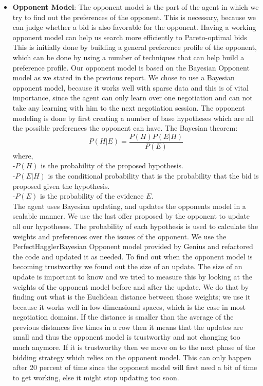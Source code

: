 \documentclass{article}
\begin{document}
\begin{enumerate}
\begin{itemize}
\item \textbf{Opponent Model}: The opponent model is the part of the agent in which we try to find out the preferences of the opponent. This is necessary, because we can judge whether a bid is also favorable for the opponent. Having a working opponent model can help us search more efficiently to Pareto-optimal bids \cite{DBLP:conf/iat/HindriksJT09} This is initially done by building a general preference profile of the opponent, which can be done by using a number of techniques that can help build a preference profile. Our opponent model is based on the Bayesian Opponent model \cite{hindriks2008opponent} as we stated in the previous report. We chose to use a Bayesian opponent model, because it works well with sparse data and this is of vital importance, since the agent can only learn over one negotiation and can not take any learning with him to the next negotiation session. The opponent modeling is done by first creating a number of base hypotheses which are all the possible preferences the opponent can have. 
The Bayesian theorem:
$$
P(H|E) =  \frac{P(H)P(E|H)}{P(E)}
$$
where,\\
\quad -$P(H)$ is the probability of the proposed hypothesis.\\
\quad -$P(E|H)$ is the conditional probability that is the probability that the bid is proposed given the hypothesis.  \\
\quad -$P(E)$ is the probability of the evidence $E$.\\

The agent uses Bayesian updating, and updates the opponents model in a scalable manner. We use the last offer proposed by the opponent to update all our hypotheses. The probability of each hypothesis is used to calculate the weights and preferences over the issues of the opponent. We use the PerfectHagglerBayesian Opponent model provided by Genius and refactored the code and updated it as needed. To find out when the opponent model is becoming trustworthy we found out the size of an update. The size of an update is important to know and we tried to measure this by looking at the weights of the opponent model before and after the update. We do that by finding out what is the Euclidean distance between those weights; we use it because it works well in low-dimensional spaces, which is the case in most negotiation domains. If the distance is smaller than the average of the previous distances five times in a row then it means that the updates are small and thus the opponent model is trustworthy and not changing too much anymore. If it is trustworthy then we move on to the next phase of the bidding strategy which relies on the opponent model. This can only happen after 20 percent of time since the opponent model will first need a bit of time to get working, else it might stop updating too soon. 


\end{itemize}
\end{enumerate}
\end{document}
